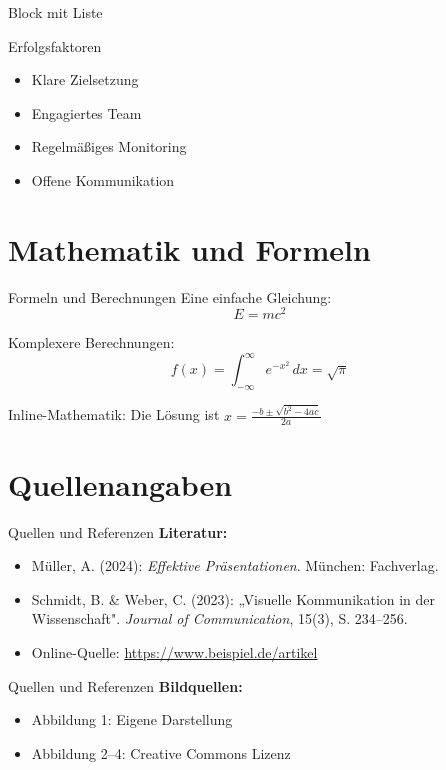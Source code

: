 \documentclass[aspectratio=169,10pt]{beamer}
\begin{document}
\begin{frame}{Block mit Liste}
\begin{block}{Erfolgsfaktoren}
  \begin{itemize}
    \item Klare Zielsetzung
    \item Engagiertes Team
    \item Regelmäßiges Monitoring
    \item Offene Kommunikation
  \end{itemize}
\end{block}
\end{frame}

\section{Mathematik und Formeln}
\begin{frame}{Formeln und Berechnungen}
Eine einfache Gleichung:
\[
E = mc^2
\]

\vspace{0.5cm}
Komplexere Berechnungen:
\[
f(x) = \int_{-\infty}^{\infty} e^{-x^2} \, dx = \sqrt{\pi}
\]

\vspace{0.3cm}
Inline-Mathematik: Die Lösung ist $x = \frac{-b \pm \sqrt{b^2-4ac}}{2a}$
\end{frame}

\section{Quellenangaben}
\begin{frame}{Quellen und Referenzen}
\small
\textbf{Literatur:}
\begin{itemize}
  \item Müller, A. (2024): \textit{Effektive Präsentationen}. München: Fachverlag.
  \item Schmidt, B. \& Weber, C. (2023): „Visuelle Kommunikation in der Wissenschaft". \textit{Journal of Communication}, 15(3), S. 234--256.
  \item Online-Quelle: \url{https://www.beispiel.de/artikel}
\end{itemize}
\end{frame}


\begin{frame}{Quellen und Referenzen}
\small
\textbf{Bildquellen:}
\begin{itemize}
  \item Abbildung 1: Eigene Darstellung
  \item Abbildung 2--4: Creative Commons Lizenz
\end{itemize}
\end{frame}
\end{document}
